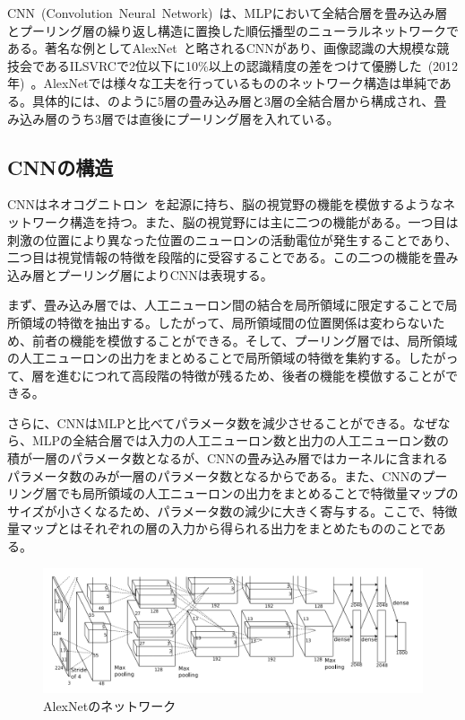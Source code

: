 CNN~(Convolution~Neural~Network)~は、MLPにおいて全結合層を畳み込み層とプーリング層の繰り返し構造に置換した順伝播型のニューラルネットワークである。著名な例としてAlexNet~\cite{AlexNet}と略されるCNNがあり、画像認識の大規模な競技会であるILSVRCで2位以下に10\%以上の認識精度の差をつけて優勝した~(2012年)~。AlexNetでは様々な工夫を行っているもののネットワーク構造は単純である。具体的には、のように5層の畳み込み層と3層の全結合層から構成され、畳み込み層のうち3層では直後にプーリング層を入れている。

\subsection{CNNの構造}

CNNはネオコグニトロン~\cite{neocognition}を起源に持ち、脳の視覚野の機能を模倣するようなネットワーク構造を持つ。また、脳の視覚野には主に二つの機能がある。一つ目は刺激の位置により異なった位置のニューロンの活動電位が発生することであり、二つ目は視覚情報の特徴を段階的に受容することである。この二つの機能を畳み込み層とプーリング層によりCNNは表現する。

まず、畳み込み層では、人工ニューロン間の結合を局所領域に限定することで局所領域の特徴を抽出する。したがって、局所領域間の位置関係は変わらないため、前者の機能を模倣することができる。そして、プーリング層では、局所領域の人工ニューロンの出力をまとめることで局所領域の特徴を集約する。したがって、層を進むにつれて高段階の特徴が残るため、後者の機能を模倣することができる。

さらに、CNNはMLPと比べてパラメータ数を減少させることができる。なぜなら、MLPの全結合層では入力の人工ニューロン数と出力の人工ニューロン数の積が一層のパラメータ数となるが、CNNの畳み込み層ではカーネルに含まれるパラメータ数のみが一層のパラメータ数となるからである。また、CNNのプーリング層でも局所領域の人工ニューロンの出力をまとめることで特徴量マップのサイズが小さくなるため、パラメータ数の減少に大きく寄与する。ここで、特徴量マップとはそれぞれの層の入力から得られる出力をまとめたもののことである。

\begin{figure}[b]
\centering
\includegraphics[width=\columnwidth]{figure/alex.png}
\caption{AlexNetのネットワーク}
\label{fig:Alex}
\end{figure}

